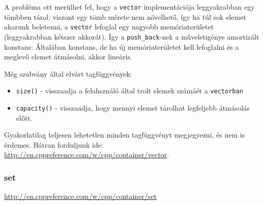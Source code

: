 \documentclass[a4paper,11.5pt]{article}
\begin{document}
	A probléma ott merülhet fel, hogy a \texttt{vector} implementációja leggyakrabban egy tömbben tárol: viszont egy tömb mérete nem növelhető, így ha túl sok elemet akarunk beletenni, a \texttt{vector} lefoglal egy nagyobb memóriaterületet (leggyakrabban kétszer akkorát). Így a \texttt{push\_back}-nek a műveletigénye amortizált konstans: Általában konstans, de ha új memóriaterületet kell lefoglalni és a meglevő elemet átmásolni, akkor lineáris.
	
	\smallskip
	Még szabvány által elvárt tagfüggvények:
	\begin{itemize}
		\item \texttt{size()} - visszaadja a felahsználó által trolt elemek számáét a \texttt{vectorban}
		\item \texttt{capacity()} - visszaadja, hogy mennyi elemet tárolhat legfeljebb átmásolás előtt.
	\end{itemize}
	Gyakorlatilag teljesen lehetetlen minden tagfüggvényt megjegyezni, és nem is érdemes. Bátran forduljunk ide: \url{http://en.cppreference.com/w/cpp/container/vector}.
	\subsubsection{set}
	\url{http://en.cppreference.com/w/cpp/container/set}
	
\end{document}
